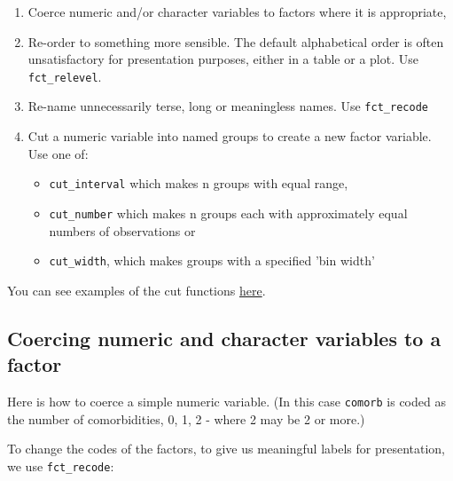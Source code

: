\documentclass[titlepage]{book}\usepackage{knitr}
\begin{document}
\begin{enumerate}
\item{Coerce numeric and/or character variables to factors where it is appropriate,}
\item{Re-order to something more sensible. The default alphabetical order is often unsatisfactory for presentation purposes, either in a table or a plot. Use \texttt{fct\_relevel}.}
\item{Re-name unnecessarily terse, long or meaningless names. Use \texttt{fct\_recode}}
\item{Cut a numeric variable into named groups to create a new factor variable. Use one of:}
\begin{itemize}
\item{\texttt{cut\_interval} which makes n groups with equal range,} 
\item{\texttt{cut\_number} which makes n groups each with approximately equal numbers of observations or}
\item{\texttt{cut\_width}, which makes groups with a specified 'bin width'}
\end{itemize}
\end{enumerate}

You can see examples of the cut functions \href{https://ggplot2.tidyverse.org/reference/cut_interval.html#examples}{here}.
 
\subsection{Coercing numeric and character variables to a factor}

Here is how to coerce a simple numeric variable. (In this case \texttt{comorb} is coded as the number of comorbidities, 0, 1, 2 - where 2 may be 2 or more.)

\begin{knitrout}
\color{fgcolor}
\end{knitrout}

To change the codes of the factors, to give us meaningful labels for presentation, we use \texttt{fct\_recode}:
\end{document}
